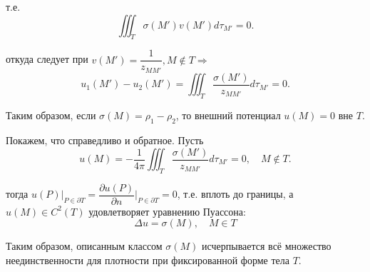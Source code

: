 \documentclass{article}
\begin{document}
т.е.
\[
	\iiint_T \sigma(M') v(M') d \tau_{M'} = 0.
\]

откуда следует при $v(M') = \dfrac{1}{z_{MM'}}, M \nin T \Rightarrow$
\[
	u_1(M') - u_2(M')= \iiint_T \dfrac{\sigma(M')}{z_{MM'}}d\tau_{M'} = 0.
\]

Таким образом, если $\sigma(M) = \rho_1 - \rho_2$, то внешний потенциал $u(M) = 0$ вне $T$.

\noindent Покажем, что справедливо и обратное.
Пусть 
$$
	u(M) = - \dfrac{1}{4 \pi} \iiint_T \dfrac{\sigma(M')}{z_{MM'}} d \tau_{M'} = 0, \quad M \nin T.
$$

тогда $u(P)|_{P \in \partial T} = \dfrac{\partial u(P)}{\partial n} \bigg|_{P \in \partial T} = 0$, т.е. вплоть до границы, а $u(M) \in C^2(T)$  удовлетворяет уравнению Пуассона:
\[
	\Delta u = \sigma (M), \quad  M \in T
\]

Таким образом, описанным классом $\sigma(M)$ исчерпывается всё множество неединственности для плотности при фиксированной форме тела $T$.
\end{document}
